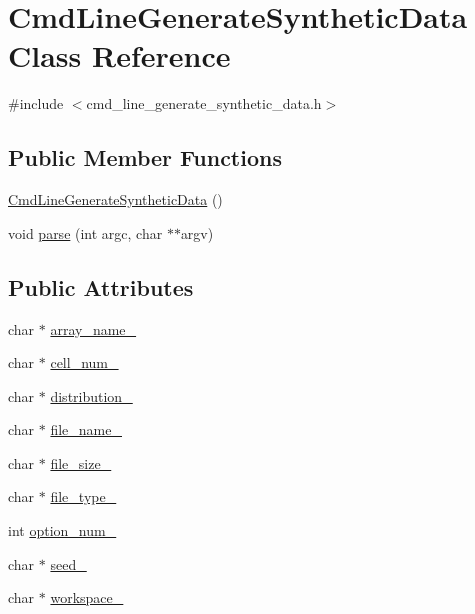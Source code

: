 \hypertarget{classCmdLineGenerateSyntheticData}{}\section{Cmd\+Line\+Generate\+Synthetic\+Data Class Reference}
\label{classCmdLineGenerateSyntheticData}


{\ttfamily \#include $<$cmd\+\_\+line\+\_\+generate\+\_\+synthetic\+\_\+data.\+h$>$}

\subsection*{Public Member Functions}
\begin{DoxyCompactItemize}
\item 
\hyperlink{classCmdLineGenerateSyntheticData_abb67ee18fac2158a9066c46565f1c4da}{Cmd\+Line\+Generate\+Synthetic\+Data} ()
\item 
void \hyperlink{classCmdLineGenerateSyntheticData_a544845e755a0aa52c4cc298097d365c2}{parse} (int argc, char $\ast$$\ast$argv)
\end{DoxyCompactItemize}
\subsection*{Public Attributes}
\begin{DoxyCompactItemize}
\item 
char $\ast$ \hyperlink{classCmdLineGenerateSyntheticData_a0bbd0609020f2ba9d19d3db9edd5995a}{array\+\_\+name\+\_\+}
\item 
char $\ast$ \hyperlink{classCmdLineGenerateSyntheticData_a5e0cdd8500788a07ceb43f0e365d9393}{cell\+\_\+num\+\_\+}
\item 
char $\ast$ \hyperlink{classCmdLineGenerateSyntheticData_ae046552046c64fc914b5114ee74f0108}{distribution\+\_\+}
\item 
char $\ast$ \hyperlink{classCmdLineGenerateSyntheticData_a2c3b1ab6214ade821d8eabf55cbc5307}{file\+\_\+name\+\_\+}
\item 
char $\ast$ \hyperlink{classCmdLineGenerateSyntheticData_aa53289d7461a1a0122d609b80ee0ae04}{file\+\_\+size\+\_\+}
\item 
char $\ast$ \hyperlink{classCmdLineGenerateSyntheticData_af3e3e257b1fc4f9ea433ca80aa8076c3}{file\+\_\+type\+\_\+}
\item 
int \hyperlink{classCmdLineGenerateSyntheticData_a5178cd743052b7a9fa6f3eada0caef04}{option\+\_\+num\+\_\+}
\item 
char $\ast$ \hyperlink{classCmdLineGenerateSyntheticData_ac19336308c1a0903967dd13fd231e7ab}{seed\+\_\+}
\item 
char $\ast$ \hyperlink{classCmdLineGenerateSyntheticData_a7ecfa9e1242ed4b2cd1f5c1bc4cf8ae5}{workspace\+\_\+}
\end{DoxyCompactItemize}


